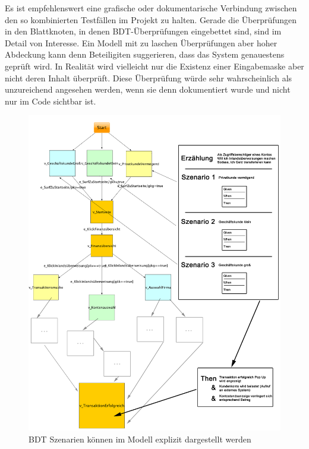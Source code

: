 Es ist empfehlenswert eine grafische oder dokumentarische Verbindung zwischen den so kombinierten Testfällen im Projekt zu halten. Gerade die Überprüfungen in den Blattknoten, in denen \Gls{BDT}-Überprüfungen eingebettet sind, sind im Detail von Interesse. Ein Modell mit zu laschen Überprüfungen aber hoher Abdeckung kann denn Beteiligiten suggerieren, dass das System genauestens geprüft wird. In Realität wird vielleicht nur die Existenz einer Eingabemaske aber nicht deren Inhalt überprüft. Diese Überprüfung würde sehr wahrscheinlich als unzureichend angesehen werden, wenn sie denn dokumentiert wurde und nicht nur im Code sichtbar ist.

\begin{figure}
\hspace*{-2cm}
  \centering
     \includegraphics[width=1.20\textwidth]{figures/mbt_bdt_gesamt.png}
  \caption{BDT Szenarien können im Modell explizit dargestellt werden}
  \label{fig:mbt_bdt_gesamt}
\end{figure}










